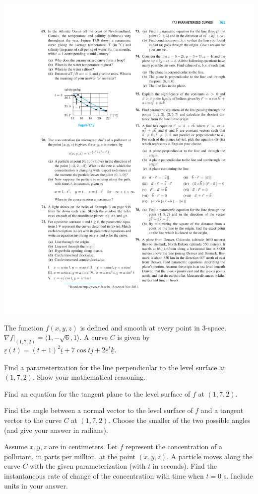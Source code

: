\documentclass[12pt,letterpaper,noanswers]{exam}
\newcommand{\mb}[1]{\underline{#1}}
\begin{document}
\begin{questions}
\begin{parts}
\end{parts}
\includegraphics{img/HW08p1.pdf}

\question The function $f(x,y,z)$ is defined and smooth at every point in $3$-space.  $\left.\nabla f\right\vert_{(1,7,2)} = \langle 1,-\sqrt{6},1\rangle$.  A curve $C$ is given by $\mb r(t) = (t+1)^2\mb i + 7\cos t\mb j + 2e^t\mb k$.



\begin{parts}
\item Find a parameterization for the line perpendicular to the level surface at $(1,7,2)$.  Show your mathematical reasoning.
\item Find an equation for the tangent plane to the level surface of $f$ at $(1,7,2)$.
\item Find the angle between a normal vector to the level surface of $f$ and a tangent vector to the curve $C$ at $(1,7,2)$.  Choose the smaller of the two possible angles (and give your answer in radians).
\item Assume $x,y,z$ are in centimeters.  Let $f$ represent the concentration of a pollutant, in parts per million, at the point $(x,y,z)$.  A particle moves along the curve $C$ with the given parameterization (with $t$ in seconds).  Find the instantaneous rate of change of the concentration with time when $t = 0$ s.  Include units in your answer.
\end{parts}



\end{questions}
\end{document}
